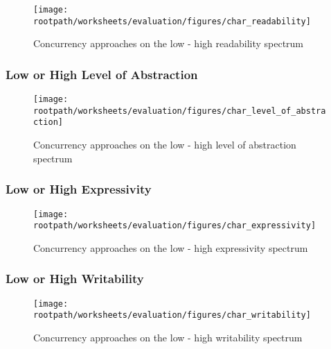 \begin{figure}[htbp]
\centering
 \texttt{[image: \\rootpath/worksheets/evaluation/figures/char\_readability]} 
 \caption{Concurrency approaches on the low - high readability spectrum}
\label{fig:char_readability}
\end{figure}

\subsubsection{Low or High Level of Abstraction}\label{subsec:level_of_abstraction}
\begin{figure}[htbp]
\centering
 \texttt{[image: \\rootpath/worksheets/evaluation/figures/char\_level\_of\_abstraction]} 
 \caption{Concurrency approaches on the low - high level of abstraction spectrum}
\label{fig:char_level_of_abstraction}
\end{figure}

\subsubsection{Low or High Expressivity}\label{subsec:expressivity}
\begin{figure}[htbp]
\centering
 \texttt{[image: \\rootpath/worksheets/evaluation/figures/char\_expressivity]} 
 \caption{Concurrency approaches on the low - high expressivity spectrum}
\label{fig:char_expressivity}
\end{figure}

\subsubsection{Low or High Writability}
\begin{figure}[htbp]
\centering
 \texttt{[image: \\rootpath/worksheets/evaluation/figures/char\_writability]} 
 \caption{Concurrency approaches on the low - high writability spectrum}
\label{fig:char_tl_writability}
\end{figure}

\worksheetend

